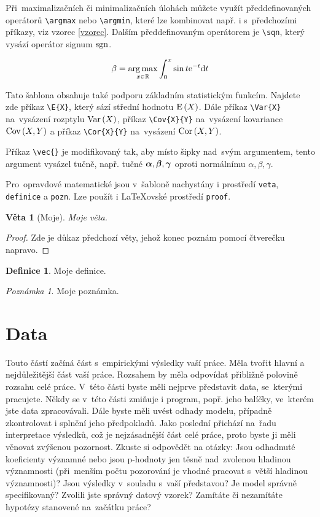 \documentclass[12pt,a4paper,oneside,final]{article}
\renewcommand\vec[1]{\ensuremath\boldsymbol{#1}} %
\newtheorem{veta}{Věta}[section]
\theoremstyle{definition}
\newtheorem{definice}{Definice}
\theoremstyle{remark}
\newtheorem*{pozn}{Poznámka}
\numberwithin{equation}{section}
\begin{document}
Při~maximalizačních či minimalizačních úlohách můžete využít předdefinovaných operátorů \verb|\argmax| nebo \verb|\argmin|, které lze kombinovat např. i s~předchozími příkazy, viz vzorec \ref{vzorec}. Dalším předdefinovaným operátorem je \verb|\sqn|, který vysází operátor signum $\operatorname*{sgn}$.

\begin{equation}
\beta = \operatorname*{arg\,max}_{x \in \mathbb{R}} \int_0^x \sin{t} \text{e}^{-t} \text{d}t
\label{vzorec}
\end{equation}

Tato šablona obsahuje také podporu základním statistickým funkcím. Najdete zde příkaz \verb|\E{X}|, který sází střední hodnotu $\text{E}\left( X \right)$. Dále příkaz \verb|\Var{X}| na~vysázení rozptylu $\text{Var}\left( X \right)$, příkaz \verb|\Cov{X}{Y}| na~vysázení kovariance $\text{Cov}\left( X, Y \right)$ a příkaz \verb|\Cor{X}{Y}| na~vysázení $\text{Cor}\left( X, Y \right)$.

Příkaz \verb|\vec{}| je modifikovaný tak, aby místo šipky nad~svým argumentem, tento argument vysázel tučně, např. tučné $\vec{\alpha}, \vec{\beta}, \vec{\gamma}$ oproti normálnímu $\alpha, \beta, \gamma$.

Pro~opravdové matematické  jsou v~šabloně nachystány i prostředí \verb|veta|, \verb|definice| a \verb|pozn|. Lze použít i \LaTeX{ovské} prostředí \verb|proof|.

\begin{veta}[Moje]
Moje věta.
\end{veta}

\begin{proof}
Zde je důkaz předchozí věty, jehož konec poznám pomocí čtverečku napravo.
\end{proof}

\begin{definice}
Moje definice.
\end{definice}

\begin{pozn}
Moje poznámka.
\end{pozn}

\section{Data}

Touto částí začíná část s~empirickými výsledky vaší práce. Měla tvořit hlavní a nejdůležitější část vaší práce. Rozsahem by měla odpovídat přibližně polovině rozsahu celé práce. V~této části byste měli nejprve představit data, se~kterými pracujete. Někdy se v~této části zmiňuje i program, popř. jeho balíčky, ve~kterém jste data zpracovávali. Dále byste měli uvést odhady modelu, případně zkontrolovat i splnění jeho předpokladů. Jako poslední přichází na~řadu interpretace výsledků, což je nejzásadnější část celé práce, proto byste ji měli věnovat zvýšenou pozornost. Zkuste si odpovědět na otázky: Jsou odhadnuté koeficienty významné nebo jsou p-hodnoty jen těsně nad~zvolenou hladinou významnosti (při~menším počtu pozorování je vhodné pracovat s~větší hladinou významnosti)? Jsou výsledky v~souladu s~vaší představou? Je model správně specifikovaný? Zvolili jste správný datový vzorek? Zamítáte či nezamítáte hypotézy stanovené na~začátku práce?
\end{document}

